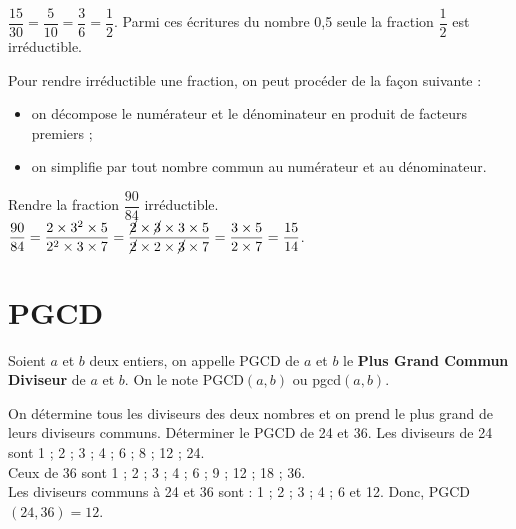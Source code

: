 \begin{exemple*1}
   $\dfrac{15}{30} =\dfrac{5}{10} =\dfrac{3}{6} = \dfrac12$. Parmi ces écritures du nombre 0,5 seule la fraction $\dfrac12$ est irréductible. 
\end{exemple*1}

\smallskip

\begin{methode}
   Pour rendre irréductible une fraction, on peut procéder de la façon suivante :
   \begin{itemize}
      \item on décompose le numérateur et le dénominateur en produit de facteurs premiers ;
      \item on simplifie par tout nombre commun au numérateur et au dénominateur.
   \end{itemize}
   \exercice
      Rendre la fraction $\dfrac{90}{84}$ irréductible.
   \correction
      $\dfrac{90}{84} =\dfrac{2\times3^2\times5}{2^2\times3\times7} =\dfrac{\cancel{2}\times\cancel{3}\times3\times5}{\cancel{2}\times2\times\cancel{3}\times7} =\dfrac{3\times5}{2\times7} =\dfrac{15}{14}$.
\end{methode}


\section{PGCD}

\begin{definition}[PGCD]
   Soient $a$ et $b$ deux entiers, on appelle PGCD de $a$ et $b$ le \textbf{Plus Grand Commun Diviseur} de $a$ et $b$. On le note PGCD$(a,b)$ ou pgcd$(a,b)$.
\end{definition}

\begin{methode}
   On détermine tous les diviseurs des deux nombres et on prend le plus grand de leurs diviseurs communs.
\exercice
   Déterminer le PGCD de 24 et 36.   
\correction Les diviseurs de 24 sont \textcolor{A1}{1} ; \textcolor{A1}{2} ; \textcolor{A1}{3} ; \textcolor{A1}{4} ; \textcolor{A1}{6} ; 8 ; \textcolor{A1}{12} ; 24. \\
   Ceux de 36 sont \textcolor{A1}{1} ; \textcolor{A1}{2} ; \textcolor{A1}{3} ; \textcolor{A1}{4} ; \textcolor{A1}{6} ; 9 ; \textcolor{A1}{12} ; 18 ; 36. \\
   Les diviseurs communs à 24 et 36 sont : 1 ; 2 ; 3 ; 4 ; 6 et 12. Donc, PGCD$(24,36)=12$.
\end{methode}

